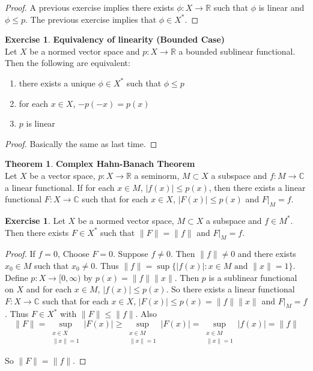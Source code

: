 \documentclass[12pt]{amsart}
\theoremstyle{definition}
\newtheorem{thm}[definition]{Theorem}
\newtheorem{ex}[definition]{Exercise}
\newcommand{\C}{\mathbb{C}}
\newcommand{\R}{\mathbb{R}}
\newcommand{\Rg}{[0,\infty)}
\newcommand{\lex}[1]{\label{ex:#1}}
\begin{document}
	\begin{proof}
	A previous exercise implies there exists $\phi: X \rightarrow \R$ such that $\phi$ is linear and $\phi \leq p$. The previous exercise implies that $\phi \in X^*$.
	\end{proof}
	
	\begin{ex} \lex{}\textbf{Equivalency of linearity (Bounded Case)}\\
	Let $X$ be a normed vector space and $p:X \rightarrow \R$ a bounded sublinear functional. Then the following are equivalent:
	\begin{enumerate}
	\item there exists a unique $\phi \in X^*$ such that $\phi \leq p$
	\item for each $x \in X$, $-p(-x) = p(x)$
	\item $p$ is linear
\end{enumerate}	
	\end{ex}
	
	\begin{proof}
	Basically the same as last time.
	\end{proof}
	
	\begin{thm}\textbf{Complex Hahn-Banach Theorem}\\
		Let $X$ be a vector space, $p:X \rightarrow \R$ a seminorm, $M \subset X$ a subspace and $f:M \rightarrow \C$ a linear functional. If for each $x \in M$, $\vert f(x) \vert \leq p(x)$, then there exists a linear functional $F:X \rightarrow \C$ such that for each $x \in X$, $\vert F(x) \vert \leq p(x)$ and $F|_{M}=f$.
	\end{thm}	
	
	\begin{ex} \lex{}
		Let $X$ be a normed vector space, $M \subset X$ a subspace and $f \in M^*$. Then there exists $F \in X^*$ such that $\|F \|= \|f \|$ and $F|_M = f$.  
	\end{ex}
	
	\begin{proof}
		If $f =0$, Choose $F=0$. Suppose $f \neq 0$. Then $\|f \|\neq 0$ and there exists $x_0 \in M$ such that $x_0  \neq 0$. Thus $\|f \|= \sup \{ \vert f(x) \vert: x \in M \text{ and } \|x \|= 1\}$. Define $p:X \rightarrow \Rg$ by $ p(x) = \|f \|\|x \|$. Then $p$ is a sublinear functional on $X$ and for each $x \in M$, $\vert f(x) \vert \leq p(x)$. So there exists a linear functional $F:X \rightarrow \C$ such that for each $x \in X$, $\vert F(x) \vert \leq p(x) = \|f \|\|x \|$ and $F|_M = f$. Thus $F \in X^*$ with $\|F \|\leq \|f \|$. Also $$\|F \|= \sup_{\substack{ x \in X \\ \|x \|= 1}} \vert F(x) \vert \geq  \sup_{\substack{ x \in M \\ \|x \|= 1}} \vert F(x) \vert = \sup_{\substack{ x \in M \\ \|x \|= 1}} \vert f(x) \vert = \|f \|$$
		
		So $\|F \|= \|f \|$.
	\end{proof}
	
\end{document}
